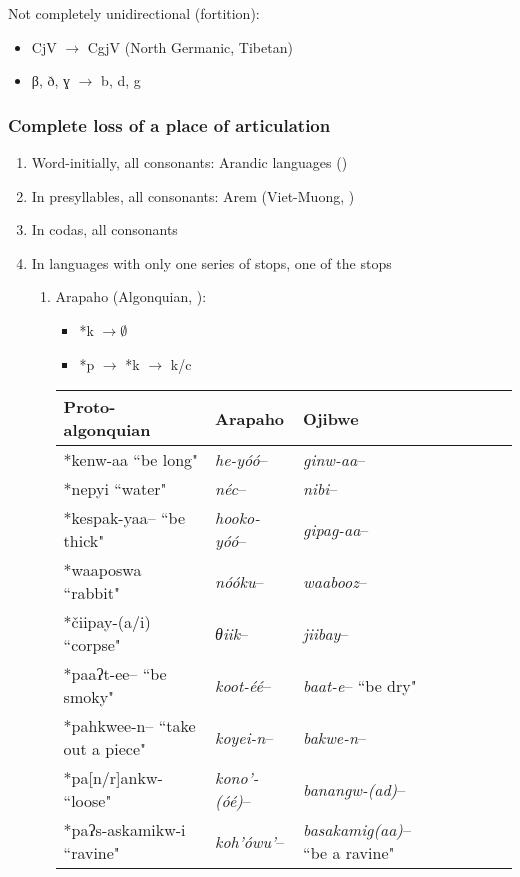 \documentclass[oldfontcommands,oneside,a4paper,11pt]{article}
\newcommand{\ipa}[1]{{\phon \mbox{#1}}} %
\begin{document}
Not completely unidirectional (fortition):
\begin{itemize}
\item  CjV $\rightarrow$ CgjV (North Germanic, Tibetan)
\item  β, ð, ɣ $\rightarrow$ b, d, g
\end{itemize}

  
 \subsubsection{Complete loss of a place of articulation}

 
  \begin{enumerate}
  \item  Word-initially, all consonants: Arandic languages (\citealt{koch04arandic})
\item In presyllables, all consonants:  Arem (Viet-Muong, \citealt{ferlus96monosyllabisme})
\item In codas, all consonants

\item In languages with only one series of stops, one of the stops
  \begin{enumerate}
\item   Arapaho (Algonquian, \citealt{goddard74arapaho}):

 \begin{itemize}
\item \ipa{*k} $\rightarrow \emptyset$
\item \ipa{*p} $\rightarrow$ \ipa{*k} $\rightarrow$  \ipa{k/c}
\end{itemize}

 \begin{table}[H]
 \centering  \label{tab:k.zero}
\begin{tabular}{lllllll}
\toprule
Proto-algonquian & Arapaho & Ojibwe \\
\midrule
  \ipa{*kenw-aa} ``be long" & \textit{he-yóó}--    &  \textit{ginw-aa}-- \\
  \ipa{*nepyi} ``water" & \textit{néc}--    &  \textit{nibi}-- \\
 \ipa{*kespak-yaa--} ``be thick" & \textit{hooko-yóó}--    &  \textit{gipag-aa}-- \\
 \ipa{*waaposwa} ``rabbit" & \textit{nóóku}--    &  \textit{waabooz}-- \\
  \ipa{*čiipay-(a/i)} ``corpse" & \textit{θiik}--    &  \textit{jiibay}-- \\
  \ipa{*paaʔt-ee--} ``be smoky" & \textit{koot-éé}--    &  \textit{baat-e}-- ``be dry"\\
    \ipa{*pahkwee-n--} ``take out a piece" & \textit{koyei-n}--    &  \textit{bakwe-n}-- \\
        \ipa{*pa[n/r]ankw-} ``loose" & \textit{kono'-(óé)}--    &  \textit{banangw-(ad)}-- \\ 
   \ipa{*paʔs-askamikw-i} ``ravine" & \textit{koh'ówu'}--    &  \textit{basakamig(aa)}-- ``be a ravine"\\ 
\bottomrule
\end{tabular}
\end{table}


\end{enumerate}
\end{enumerate}
\end{document}
